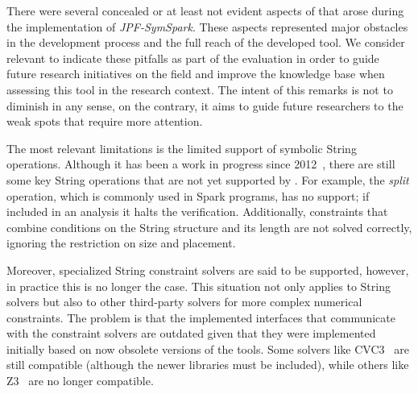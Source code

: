 

%
%
%
%

There were several concealed or at least not evident aspects of \spf{} that arose during the implementation of \textit{JPF-SymSpark}. These aspects represented major obstacles in the development process and the full reach of the developed tool. We consider relevant to indicate these pitfalls as part of the evaluation in order to guide future research initiatives on the field and improve the knowledge base when assessing this tool in the research context. The intent of this remarks is not to diminish \spf{} in any sense, on the contrary, it aims to guide future researchers to the weak spots that require more attention.

The most relevant limitations is the limited support of symbolic String operations. Although it has been a work in progress since 2012~\cite{Redelinghuys2012,Pasareanu2013}, there are still some key String operations that are not yet supported by \spf{}. For example, the \textit{split} operation, which is commonly used in Spark programs, has no support; if included in an analysis it halts the verification. Additionally, constraints that combine conditions on the String structure and its length are not solved correctly, ignoring the restriction on size and placement.

Moreover, specialized String constraint solvers are said to be supported, however, in practice this is no longer the case. This situation not only applies to String solvers but also to other third-party solvers for more complex numerical constraints. The problem is that the implemented interfaces that communicate with the constraint solvers are outdated given that they were implemented initially based on now obsolete versions of the tools. Some solvers like CVC3~\cite{Barrett2007} are still compatible (although the newer libraries must be included), while others like Z3~\cite{DeMoura2008} are no longer compatible.

